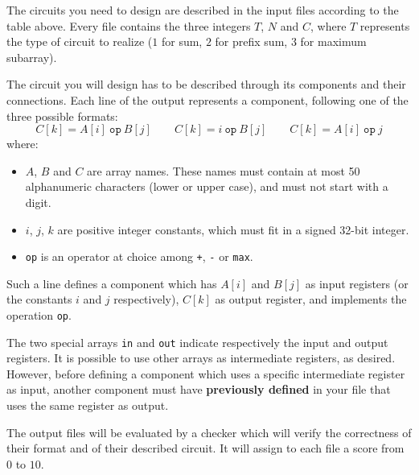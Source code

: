 \InputFormat

The circuits you need to design are described in the input files according to the table above. Every file contains the three integers $T$, $N$ and $C$, where $T$ represents the type of circuit to realize ($1$ for sum, $2$ for prefix sum, $3$ for maximum subarray).


\OutputFormat

The circuit you will design has to be described through its components and their connections. Each line of the output represents a component, following one of the three possible formats:
\[
C[k] = A[i]\ \texttt{op}\ B[j] \qquad C[k] = i\ \texttt{op}\ B[j] \qquad C[k] = A[i]\ \texttt{op}\ j
\]
where:
\begin{itemize}
	\item $A$, $B$ and $C$ are array names. These names must contain at most 50 alphanumeric characters (lower or upper case), and must not start with a digit.
	\item $i$, $j$, $k$ are positive integer constants, which must fit in a signed 32-bit integer.
	\item \texttt{op} is an operator at choice among \texttt{+}, \texttt{-} or \texttt{max}.
\end{itemize}
Such a line defines a component which has $A[i]$ and $B[j]$ as input registers (or the constants $i$ and $j$ respectively), $C[k]$ as output register, and implements the operation \texttt{op}.

The two special arrays \texttt{in} and \texttt{out} indicate respectively the input and output registers. It is possible to use other arrays as intermediate registers, as desired. However, before defining a component which uses a specific intermediate register as input, another component must have \textbf{previously defined} in your file that uses the same register as output.



\Scoring

The output files will be evaluated by a checker which will verify the correctness of their format and of their described circuit. It will assign to each file a score from $0$ to $10$.

